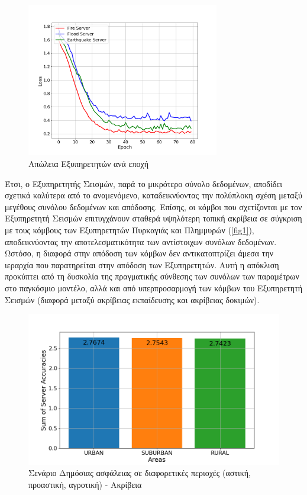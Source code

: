 \newpage

\begin{figure}[ht]
    \centering
    \includegraphics[width=0.75\textwidth]{figures/chapter2/Server_Losses.png}
    \caption{Απώλεια Εξυπηρετητών ανά εποχή}
    \label{fig4}
\end{figure}

Έτσι, ο Εξυπηρετητής Σεισμών, παρά το μικρότερο σύνολο δεδομένων, αποδίδει σχετικά καλύτερα από το αναμενόμενο, καταδεικνύοντας την πολύπλοκη σχέση μεταξύ μεγέθους συνόλου δεδομένων και απόδοσης. Επίσης, οι κόμβοι που σχετίζονται με τον Εξυπηρετητή Σεισμών επιτυγχάνουν σταθερά υψηλότερη τοπική ακρίβεια σε σύγκριση με τους κόμβους των Εξυπηρετητών Πυρκαγιάς και Πλημμυρών (\ref{fig1}), αποδεικνύοντας την αποτελεσματικότητα των αντίστοιχων συνόλων δεδομένων. Ωστόσο, η διαφορά στην απόδοση των κόμβων δεν αντικατοπτρίζει άμεσα την ιεραρχία που παρατηρείται στην απόδοση των Εξυπηρετητών. Αυτή η απόκλιση προκύπτει από τη δυσκολία της πραγματικής σύνθεσης των συνόλων των παραμέτρων στο παγκόσμιο μοντέλο, αλλά και από υπερπροσαρμογή των κόμβων του Εξυπηρετητή Σεισμών (διαφορά μεταξύ ακρίβειας εκπαίδευσης και ακρίβειας δοκιμών).

\newpage

\begin{figure}[H]
    \centering
    \includegraphics[width=\textwidth]{figures/chapter2/Sum_of_Accuracies_per_Area.png}
    \caption{Σενάριο Δημόσιας ασφάλειας σε διαφορετικές περιοχές (αστική, προαστική, αγροτική) - Ακρίβεια}
    \label{fig5}
\end{figure}

